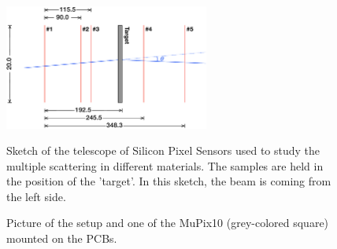 \begin{refsection}
        \begin{figure}
            \centering
            \includegraphics[width=0.6\textwidth]{Figures/muEDM_Dec2021/Positions_Telescope.png}\\
            \caption{Sketch of the telescope of Silicon Pixel Sensors used to study the multiple scattering in different materials.
            The samples are held in the position of the 'target'. 
            In this sketch, the beam is coming from the left side.}
            \label{fig:muEDM:bt2021:telescope}
        \end{figure}

        \begin{figure}   
            \centering
            \hfill
            \caption{Picture of the setup and one of the MuPix10 (grey-colored square) mounted on the PCBs.}
            \label{fig:muEDM:bt2021:setup}
        \end{figure}


\end{refsection}
